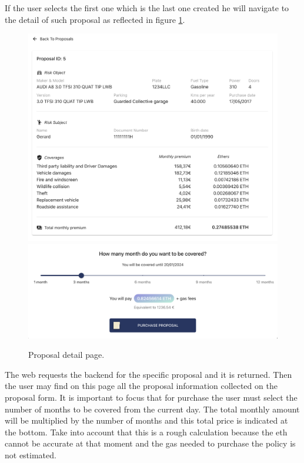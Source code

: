 {If the user selects the first one which is the last one created he will navigate to the detail of such proposal as reflected in figure \ref{fig:proposal-detail}.
\begin{figure}[H]
\centering
\includegraphics[width=12cm]{img/results/proposal-detail-1.png}
\includegraphics[width=12cm]{img/results/proposal-detail-2.png}
\caption[Insurechain: Proposal detail page]{\footnotesize{Proposal detail page.}}
\label{fig:proposal-detail}
\end{figure}

The web requests the backend for the specific proposal and it is returned. Then the user may find on this page all the proposal information collected on the proposal form. It is important to focus that for purchase the user must select the number of months to be covered from the current day. The total monthly amount will be multiplied by the number of months and this total price is indicated at the bottom. Take into account that this is a rough calculation because the \acrshort{eth} cannot be accurate at that moment and the gas needed to purchase the policy is not estimated.
}

